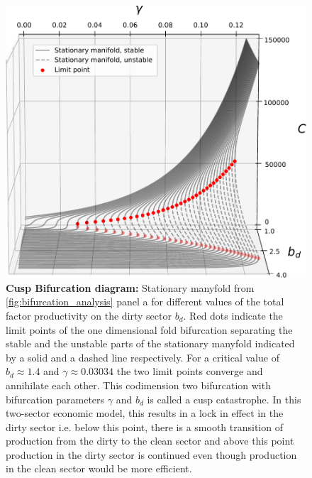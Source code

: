 \begin{figure}[ht!]
\centering\includegraphics[width=\linewidth]{figures/cusp_better.pdf}
\caption[Cusp catastrophe depending on learning rate in the clean sector and total factor productivity in the dirty sector]{\textbf{Cusp Bifurcation diagram:}
Stationary manyfold from \cref{fig:bifurcation_analysis} panel a for different values of the total factor productivity on the dirty sector $b_d$. Red dots indicate the limit points of the one dimensional fold bifurcation separating the stable and the unstable parts of the stationary manyfold indicated by a solid and a dashed line respectively. For a critical value of $b_d \approx 1.4$ and $\gamma \approx 0.03034$ the two limit points converge and annihilate each other. This codimension two bifurcation with bifurcation parameters $\gamma$ and $b_d$ is called a cusp catastrophe. In this two-sector economic model, this results in a lock in effect in the dirty sector i.e. below this point, there is a smooth transition of production from the dirty to the clean sector and above this point production in the dirty sector is continued even though production in the clean sector would be more efficient. \label{fig:cusp}}
\end{figure}

